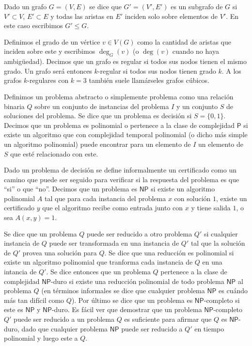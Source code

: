 \documentclass[10pt]{amsart}
\theoremstyle{definition}
\numberwithin{equation}{section}
\newcommand{\edge}[1]{\langle #1\rangle}
\begin{document}

Dado un grafo $G = (V,E)$ se dice que $G' = (V', E')$ es un subgrafo  de $G$ si $V' \subset V$, $E' \subset E$ y todas las aristas en $E'$ inciden solo sobre elementos de $V'$.  En este caso escribimos $G' \le G$.
 
Definimos el grado de un v\'ertice $v \in V(G)$ como la cantidad de aristas que inciden sobre este y escribimos $\deg_G(v)$ (o $\deg(v)$ cuando no haya ambigüedad). Decimos que un grafo es regular si todos sus nodos tienen el mismo grado. Un grafo ser\'a entonces $k$-regular si todos sus nodos tienen grado $k$. A los grafos $k$-regulares con $k = 3$ tambi\'en suele llam\'arseles grafos c\'ubicos.


Definimos un problema abstracto o simplemente problema como una relaci\'on binaria $Q$ sobre un conjunto de instancias del problema $I$ y un conjunto $S$ de soluciones del problema. Se dice que un problema es decisi\'on si $S = \{0, 1\}$.  Decimos que un problema es polinomial o pertenece a la clase de complejidad $\mathsf{P}$ si existe un algoritmo que con complejidad temporal polinomial (o dicho m\'as simple un algoritmo polinomial) puede encontrar para un elemento de $I$ un elemento de $S$ que est\'e relacionado con este. 

Dado un problema de decisi\'on se define informalmente un certificado  como un camino que puede ser seguido para verificar si la respuesta del problema es que ``si'' o que ``no''. Decimos que un problema es $\mathsf{NP}$ si existe un algoritmo polinomial $A$ tal que para cada instancia del problema $x$ con soluci\'on $1$, existe un certificado $y$ que el algoritmo recibe como entrada junto con $x$ y tiene salida $1$, o sea $A(x,y) = 1$.

Se dice que un problema $Q$ puede ser reducido a otro problema $Q'$ si cualquier instancia de $Q$ puede ser transformada en una instancia de $Q'$ tal que la soluci\'on de $Q'$ provea una soluci\'on para $Q$. Se dice que una reducci\'on  es polinomial si existe un algoritmo polinomial que tranforma cada instancia de $Q$ en una intancia de $Q'$. Se dice entonces que un problema $Q$ pertenece a la clase de complejidad $\mathsf{NP}$-duro si existe una reducci\'on polinomial de todo problema $\mathsf{NP}$ al problema $Q$ (en t\'erminos informales se dice que cualquier problema $\mathsf{NP}$ es cu\'ando m\'as tan dif\'icil como $Q$). Por \'ultimo se dice que un problema es $\mathsf{NP}$-completo si este es $\mathsf{NP}$ y $\mathsf{NP}$-duro. Es f\'acil ver que demostrar que un problema $\mathsf{NP}$-completo $Q'$ puede ser reducido a un problema  $Q$ es  suficiente para afirmar que $Q$ es $\mathsf{NP}$-duro, dado que cualquier problema $\mathsf{NP}$ puede ser reducido a $Q'$ en tiempo polinomial y luego este a $Q$.
\end{document}
